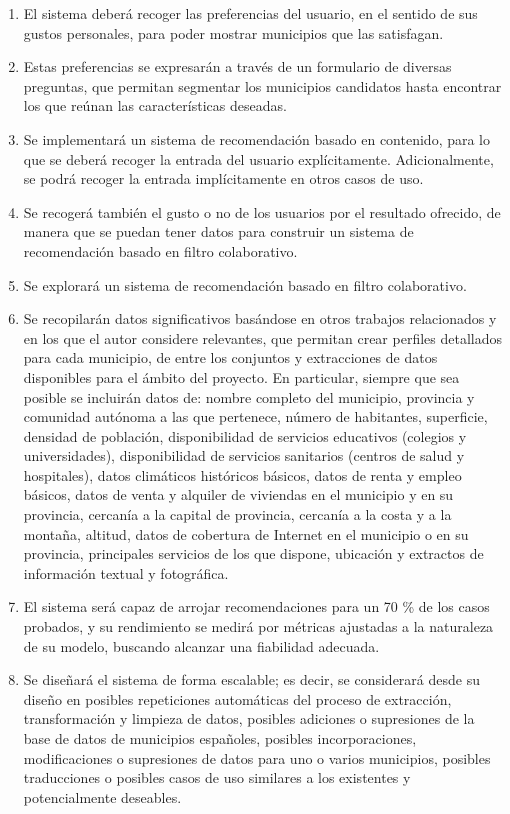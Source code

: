 \begin{enumerate}
    \item El sistema deberá recoger las preferencias del usuario, en el sentido de sus gustos personales, para poder mostrar municipios que las satisfagan.
    \item Estas preferencias se expresarán a través de un formulario de diversas preguntas, que permitan segmentar los municipios candidatos hasta encontrar los que reúnan las características deseadas.
    \item Se implementará un sistema de recomendación basado en contenido, para lo que se deberá recoger la entrada del usuario explícitamente. Adicionalmente, se podrá recoger la entrada implícitamente en otros casos de uso.
    \item Se recogerá también el gusto o no de los usuarios por el resultado ofrecido, de manera que se puedan tener datos para construir un sistema de recomendación basado en filtro colaborativo.
    \item Se explorará un sistema de recomendación basado en filtro colaborativo.
    \item Se recopilarán datos significativos basándose en otros trabajos relacionados y en los que el autor considere relevantes, que permitan crear perfiles detallados para cada municipio, de entre los conjuntos y extracciones de datos disponibles para el ámbito del proyecto. En particular, siempre que sea posible se incluirán datos de: nombre completo del municipio, provincia y comunidad autónoma a las que pertenece, número de habitantes, superficie, densidad de población, disponibilidad de servicios educativos (colegios y universidades), disponibilidad de servicios sanitarios (centros de salud y hospitales), datos climáticos históricos básicos, datos de renta y empleo básicos, datos de venta y alquiler de viviendas en el municipio y en su provincia, cercanía a la capital de provincia, cercanía a la costa y a la montaña, altitud, datos de cobertura de Internet en el municipio o en su provincia, principales servicios de los que dispone, ubicación y extractos de información textual y fotográfica.
    \item El sistema será capaz de arrojar recomendaciones para un 70 \% de los casos probados, y su rendimiento se medirá por métricas ajustadas a la naturaleza de su modelo, buscando alcanzar una fiabilidad adecuada.
    \item Se diseñará el sistema de forma escalable; es decir, se considerará desde su diseño en posibles repeticiones automáticas del proceso de extracción, transformación y limpieza de datos, posibles adiciones o supresiones de la base de datos de municipios españoles, posibles incorporaciones, modificaciones o supresiones de datos para uno o varios municipios, posibles traducciones o posibles casos de uso similares a los existentes y potencialmente deseables.

\end{enumerate}
